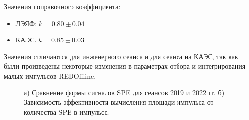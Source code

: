 Значения поправочного коэффициента: %
\begin{itemize}
    \item ЛЭЯФ: $k = 0.80\pm 0.04$
    \item КАЭС: $k = 0.85\pm 0.03$
\end{itemize}

Значения отличаются для инженерного сеанса и для сеанса на КАЭС, так как были произведены некоторые изменения в параметрах отбора и интегрирования малых импульсов REDOffline.
\begin{figure}[ht]
  \begin{minipage}[ht]{0.49\linewidth}
  \end{minipage}
  \hfill
  \begin{minipage}[ht]{0.49\linewidth}
  \end{minipage}
  \caption{а) Сравнение формы сигналов SPE для сеансов 2019 и 2022 гг. б) Зависимость эффективности вычисления площади импульса от количества SPE в импульсе.}
  \label{img:spe_eff}  
\end{figure}

